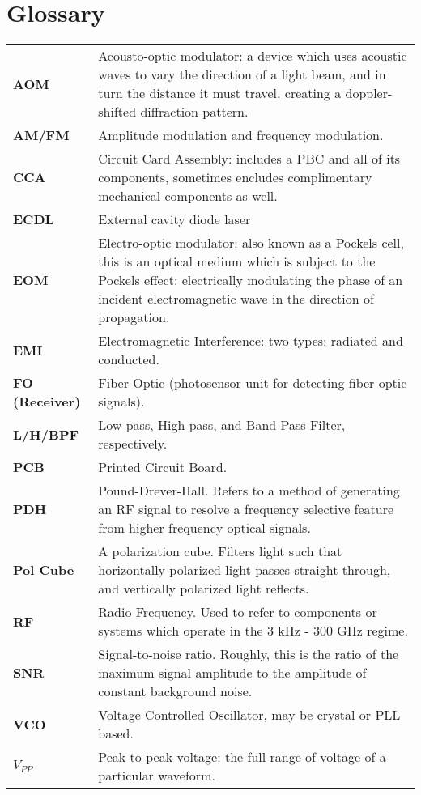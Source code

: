 \newpage
\section*{Glossary}

\begin{tabularx}{\linewidth}{lX}
  {\bf AOM} & Acousto-optic modulator: a device which uses acoustic waves to vary the direction of a light beam, and in turn the distance it must travel, creating a doppler-shifted diffraction pattern. \\
  {\bf AM/FM} & Amplitude modulation and frequency modulation. \\
  {\bf CCA} & Circuit Card Assembly: includes a PBC and all of its components,
  sometimes encludes complimentary mechanical components as well. \\
  {\bf ECDL} & External cavity diode laser \\
  {\bf EOM} & Electro-optic modulator: also known as a Pockels cell, this
  is an optical medium which is subject to the Pockels effect: electrically
  modulating the phase of an incident electromagnetic wave in the direction
  of propagation.\\
  {\bf EMI} & Electromagnetic Interference: two types: radiated and conducted.\\
  {\bf FO (Receiver)} & Fiber Optic (photosensor unit for detecting fiber optic
  signals).  \\
  {\bf L/H/BPF} & Low-pass, High-pass, and Band-Pass Filter, respectively. \\
  {\bf PCB} & Printed Circuit Board. \\
  {\bf PDH} & Pound-Drever-Hall. Refers to a method of generating an RF signal to resolve a frequency selective feature from higher frequency optical signals. \\
  {\bf Pol Cube} & A polarization cube.  Filters light such that horizontally polarized light passes straight through, and vertically polarized light reflects. \\
  {\bf RF} & Radio Frequency. Used to refer to components or systems which
  operate in the 3 kHz - 300 GHz regime. \\
  {\bf SNR} & Signal-to-noise ratio. Roughly, this is the ratio of the maximum signal amplitude to the amplitude of constant background noise. \\
  {\bf VCO} & Voltage Controlled Oscillator, may be crystal or PLL based. \\
  {\bf $V_{PP}$} & Peak-to-peak voltage: the full range of voltage of a
  particular waveform.
\end{tabularx}
